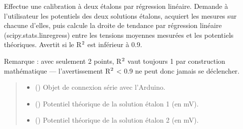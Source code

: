 \documentclass[letterpaper,10pt,english]{sphinxmanual}
\begin{document}

\begin{fulllineitems}
\label{\detokenize{calibration:calibration.calibration_2_etalons}}
\pysigstartsignatures
\pysiglinewithargsret
{}
{\sphinxparamcomma {}\sphinxparamcomma {}\sphinxparamcomma {}\sphinxparamcomma {}}
{}
\pysigstopsignatures
\sphinxAtStartPar

Effectue une calibration à deux étalons par régression linéaire.
Demande à l’utilisateur les potentiels des deux solutions étalons, acquiert
les mesures sur chacune d’elles, puis calcule la droite de tendance par
régression linéaire (scipy.stats.linregress) entre les tensions moyennes
mesurées et les potentiels théoriques. Avertit si le R\(\sp{\text{2}}\) est inférieur à 0.9.

\sphinxAtStartPar
Remarque : avec seulement 2 points, R\(\sp{\text{2}}\) vaut toujours 1 par construction
mathématique — l’avertissement R\(\sp{\text{2}}\) \textless{} 0.9 ne peut donc jamais se déclencher.
\begin{quote}\begin{description}
\begin{itemize}
\item {} 
\sphinxAtStartPar
{} () \textendash{} Objet de connexion série avec l’Arduino.

\item {} 
\sphinxAtStartPar
{} (\sphinxstyleliteralemphasis{\sphinxupquote{, }}) \textendash{} Potentiel théorique de la solution étalon 1 (en mV).

\item {} 
\sphinxAtStartPar
{} (\sphinxstyleliteralemphasis{\sphinxupquote{, }}) \textendash{} Potentiel théorique de la solution étalon 2 (en mV).


\end{itemize}
\end{description}
\end{quote}
\end{fulllineitems}
\end{document}
